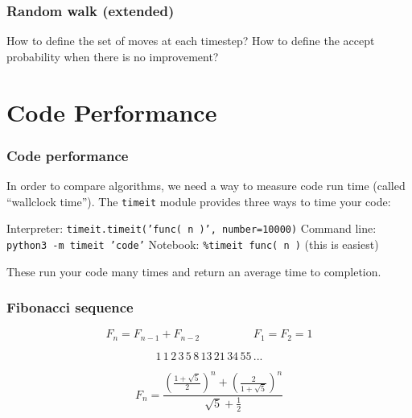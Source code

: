 \documentclass[11pt]{beamer}
\begin{document}
\begin{frame}[fragile]
  \frametitle{Random walk (extended)}
  \Enlarge

  \begin{enumerate}
  \myitem How to define the set of moves at each timestep?
  \myitem How to define the accept probability when there is no improvement?
  \begin{enumerate}
  \end{enumerate}
  \end{enumerate}
\end{frame}


\iffalse
\section{Code Performance}

\begin{frame}[fragile]
  \frametitle{Code performance}
  \Enlarge

  \begin{enumerate}
  \myitem  In order to compare algorithms, we need a way to measure code run time (called ``wallclock time''). \pause
  \myitem  The \texttt{timeit} module provides three ways to time your code: \pause
    \begin{enumerate}
    \mysubitem  Interpreter:  \texttt{timeit.timeit('func( n )', number=10000)} \pause
    \mysubitem  Command line:  \texttt{python3 -m timeit 'code'} \pause
    \mysubitem  Notebook:  \texttt{\%timeit func( n )}  (this is easiest) \pause
    \end{enumerate}
  \myitem  These run your code many times and return an average time to completion.
  \end{enumerate}
\end{frame}

\begin{frame}[fragile]
  \frametitle{Fibonacci sequence}
  \Enlarge

  $$
  F_{n} = F_{n-1} + F_{n-2} \hspace{2cm} F_{1} = F_{2} = 1
  $$

  $$
  1\,1\,2\,3\,5\,8\,13\,21\,34\,55\,...
  $$

  \pause

  $$
  F_{n} = \frac{\left( \frac{1+\sqrt{5}}{2} \right)^{n} + \left( \frac{2}{1+\sqrt{5}} \right)^{n}}{\sqrt{5} + \frac{1}{2}}
  $$
\end{frame}
\end{document}
